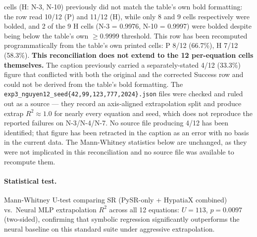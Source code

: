 \documentclass[twoside,11pt]{article}
\newcommand{\Rsq}{R^{2}}
\begin{document}
\begin{table}[h]
\begin{threeparttable}
\begin{tablenotes}
    cells (H: N-3, N-10) previously did not match the table's own bold
    formatting: the row read 10/12 (P) and 11/12 (H), while only 8 and 9 cells
    respectively were bolded, and 2 of the 9 H cells (N-3 = 0.9976, N-10 =
    0.9997) were bolded despite being below the table's own $\ge 0.9999$
    threshold. This row has been recomputed programmatically from the table's
    own printed cells: P 8/12 (66.7\%), H 7/12 (58.3\%). \textbf{This
    reconciliation does not extend to the 12 per-equation cells themselves.}
    The caption previously carried a separately-stated 4/12 (33.3\%) figure
    that conflicted with both the original and the corrected Success row and
    could not be derived from the table's bold formatting.
    The \texttt{exp3\_nguyen12\_seed\{42,99,123,777,2024\}.json} files were
    checked and ruled out as a source --- they record an axis-aligned
    extrapolation split and produce extrap $\Rsq\approx1.0$ for nearly every
    equation and seed, which does not reproduce the reported failures on
    N-3/N-4/N-7. No source file producing 4/12 has been identified; that
    figure has been retracted in the caption as an error with no basis in
    the current data. The Mann-Whitney statistics below are unchanged, as they
    were not implicated in this reconciliation and no source file was
    available to recompute them.
\end{tablenotes}
\end{threeparttable}
\end{table}

\paragraph{Statistical test.}
Mann-Whitney U-test comparing SR (PySR-only + HypatiaX combined) vs.\ Neural MLP
extrapolation $\Rsq$ across all 12 equations: $U=113$, $p=0.0097$ (two-sided),
confirming that symbolic regression significantly outperforms the neural baseline
on this standard suite under aggressive extrapolation.
\end{document}
